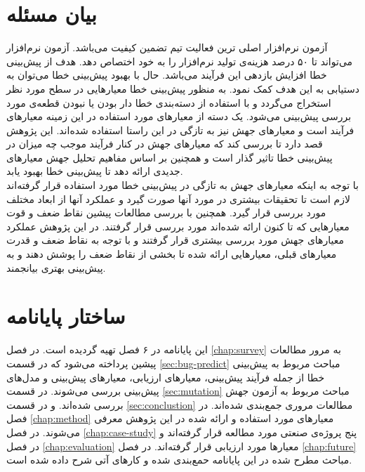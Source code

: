 \section{بیان مسئله}
آزمون نرم‌افزار اصلی ترین فعالیت تیم  تضمین کیفیت می‌باشد. آزمون نرم‌افزار می‌تواند تا ۵۰ درصد هزینه‌ی تولید نرم‌افزار را به خود اختصاص دهد. هدف از پیش‌بینی خطا افزایش بازدهی این فرآیند می‌باشد. حال با بهبود پیش‌بینی خطا می‌توان به دستیابی به این هدف کمک نمود. به منظور پیش‌بینی خطا معیارهایی  در سطح مورد نظر استخراج می‌گردد و با استفاده از دسته‌بندی خطا دار بودن یا نبودن قطعه‌ی مورد بررسی پیش‌بینی می‌شود. یک دسته از معیارهای مورد استفاده در این زمینه معیارهای فرآیند است و معیارهای جهش نیز به تازگی در این راستا استفاده شده‌اند. این پژوهش قصد دارد تا بررسی کند که معیارهای جهش در کنار فرآیند موجب چه میزان در پیش‌بینی خطا تاثیر گذار است و همچنین بر اساس مفاهیم تحلیل جهش معیارهای جدیدی ارائه دهد تا پیش‌بینی خطا بهبود یابد. \\

با توجه به اینکه معیارهای جهش به تازگی در پیش‌بینی خطا مورد استفاده قرار گرفته‌اند لازم است تا تحقیقات بیشتری در مورد آنها صورت گیرد و عملکرد آنها از ابعاد مختلف مورد بررسی قرار گیرد. همچنین با بررسی مطالعات پیشین نقاط ضعف و قوت معیارهایی که تا کنون ارائه شده‌اند مورد بررسی قرار گرفتند. در این پژوهش عملکرد معیارهای جهش مورد بررسی بیشتری قرار گرفتند و با توجه به نقاط ضعف و قدرت معیارهای قبلی، معیارهایی ارائه شده تا بخشی از نقاط ضعف را پوشش دهند و به پیش‌بینی بهتری بیانجمند. 
\section{ساختار پایانامه}

این پایانامه در ۶ فصل تهیه گردیده است. در فصل \ref{chap:survey} به مرور مطالعات پیشین پرداخته می‌شود که در  قسمت \ref{sec:bug-predict}  مباحث مربوط به پیش‌بینی خطا از جمله فرآیند پیش‌بینی، معیارهای ارزیابی، معیارهای پیش‌بینی و مدل‌های پیش‌بینی بررسی می‌شوند. در قسمت \ref{sec:mutation} مباحث مربوط به آزمون جهش بررسی شده‌اند. و در قسمت \ref{sec:conclustion} مطالعات مروری جمع‌بندی شده‌اند. در فصل \ref{chap:method} معیارهای مورد استفاده و ارائه شده در این پژوهش معرفی می‌شوند. در فصل \ref{chap:case-study} پنج پروژه‌ی صنعتی مورد مطالعه قرار گرفته‌اند و در فصل \ref{chap:evaluation} معیارها مورد ارزیابی قرار گرفته‌اند. در فصل \ref{chap:future} مباحث مطرح شده در این پایانامه حمع‌بندی شده و کارهای آتی شرح داده شده است. 
	
